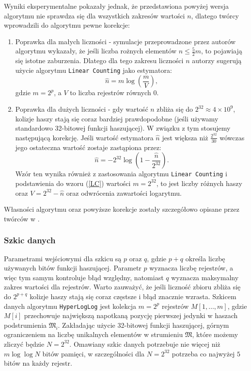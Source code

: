 Wyniki eksperymentalne pokazały jednak, że przedstawiona powyżej wersja algorytmu nie sprawdza się dla wszystkich zakresów wartości $n$, dlatego twórcy wprowadzili do algorytmu pewne korekcje:
\begin{enumerate}
    \item \label{corr_1} Poprawka dla małych liczności - symulacje przeprowadzone przez autorów algorytmu wykazały, że jeśli liczba rożnych elementów $n \le \frac{5}{2}m$, 
    to pojawiają się istotne zaburzenia. Dlatego dla tego zakresu liczności $n$ autorzy sugerują użycie  algorytmu \texttt{Linear Counting} \cite{linear} jako estymatora:
    \begin{equation}
    \hat{n} = {m}\log(\frac{m}{V}),
    \label{LC}
    \end{equation}
    gdzie $m = 2^p$, a $V$ to liczba rejestrów równych $0$.
    
    
    \item \label{corr_2} Poprawka dla dużych liczności - gdy wartość $n$ zbliża się do $2^{32} \approx 4 \times 10^9$, kolizje haszy stają się coraz bardziej prawdopodobne (jeśli używamy standardowo 32-bitowej funkcji haszującej). 
    W związku z tym stosujemy następującą korekcję. Jeśli wartość estymatora $\hat{n}$ jest większa niż $\frac{2^{32}}{30}$ wówczas jego ostateczna wartość zostaje zastąpiona przez:
    \begin{equation}
	    \hat{n} = {-2}^{32}\log(1 - \frac{\hat{n}}{2^{32}}).
    \end{equation}
    Wzór ten wynika również z zastosowania algorytmu \texttt{Linear Counting} i podstawienia do wzoru (\ref{LC}) wartości $m = 2^{32}$, to jest liczby różnych haszy  oraz $V = 2^{32} - \hat{n}$ oraz odwrócenia zawartości logarytmu.
\end{enumerate}
Własności algorytmu oraz powyższe korekcje zostały szczegółowo opisane przez twórców w \cite{hll}.

\subsubsection{Szkic danych}
\label{HLL_sketch}
Parametrami wejściowymi dla szkicu są $p$ oraz $q$, gdzie $p + q$ określa liczbę używanych bitów funkcji haszującej. Parametr $p$ wyznacza liczbę rejestrów, a więc tym samym kontroluje błąd względny, natomiast $q$ wyznacza maksymalny zakres wartości dla rejestrów. Warto zauważyć, że jeśli liczność zbioru zbliża się do $2^{p+q}$ kolizje haszy stają się coraz częstsze i błąd znacznie wzrasta. 
Szkicem danych algorytmu \texttt{HyperLogLog} jest kolekcja $m = 2^p$ rejestrów $M[1,\ldots,m]$, gdzie $M[i]$  przechowuje największą napotkaną pozycję pierwszej jedynki w haszach podstrumienia $\mathfrak{M}_i$. Zakładając użycie 32-bitowej funkcji haszującej, górnym ograniczeniem na liczbę unikalnych elementów w strumieniu  $\mathfrak{M}$, które możemy zliczyć będzie $N=2^{32}$. Omawiany szkic danych potrzebuje nie więcej niż $m\log{\log{N}}$ bitów pamięci, w szczególności dla $N=2^{32}$ potrzeba co najwyżej $5$ bitów na każdy rejestr.

